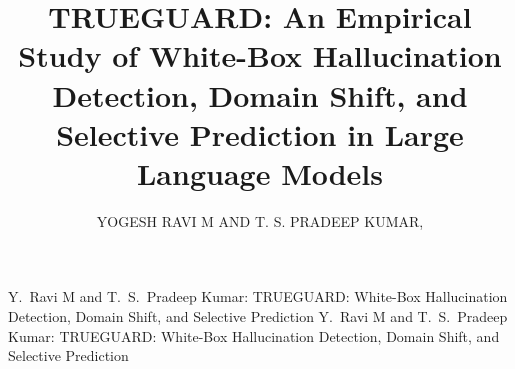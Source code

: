 \documentclass{ieeeaccess}
\begin{document}

\title{TRUEGUARD: An Empirical Study of White-Box Hallucination Detection, Domain Shift, and Selective Prediction in Large Language Models}

\author{\uppercase{Yogesh Ravi M} AND
\uppercase{T. S. Pradeep Kumar}, }

\address[1]{School of Computer Science and Engineering, Vellore Institute of Technology, Chennai, Tamil Nadu, India (e-mail: yogeshravi4343@gmail.com; tspradeepkumar@vit.ac.in)}

\markboth
{Y.\ Ravi M and T.\ S.\ Pradeep Kumar: TRUEGUARD: White-Box Hallucination Detection, Domain Shift, and Selective Prediction}
{Y.\ Ravi M and T.\ S.\ Pradeep Kumar: TRUEGUARD: White-Box Hallucination Detection, Domain Shift, and Selective Prediction}

\end{document}
